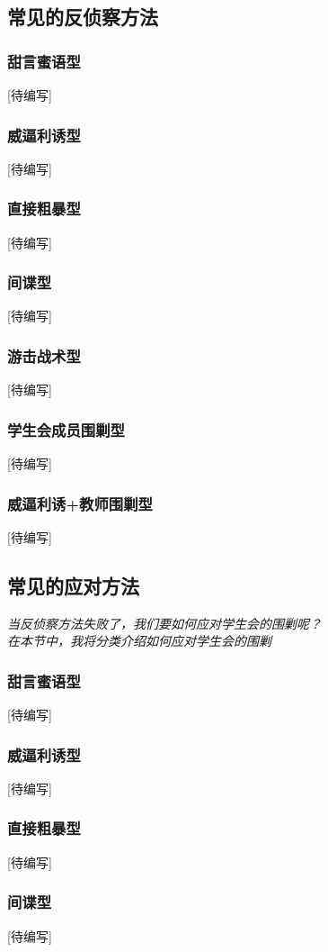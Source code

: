 \documentclass[UTF8]{ctexart}
\begin{document}
	\subsection{常见的反侦察方法}
	\subsubsection{甜言蜜语型}
	[待编写]
	\subsubsection{威逼利诱型}
	[待编写]
	\subsubsection{直接粗暴型}
	[待编写]
	\subsubsection{间谍型}
	[待编写]
	\subsubsection{游击战术型}
	[待编写]
	\subsubsection{学生会成员围剿型}
	[待编写]
	\subsubsection{威逼利诱+教师围剿型}
	[待编写]
		\subsection{常见的应对方法}
		\textit{当反侦察方法失败了，我们要如何应对学生会的围剿呢？\\
		在本节中，我将分类介绍如何应对学生会的围剿}
\subsubsection{甜言蜜语型}
[待编写]
\subsubsection{威逼利诱型}
[待编写]
\subsubsection{直接粗暴型}
[待编写]
\subsubsection{间谍型}
[待编写]
\end{document}
